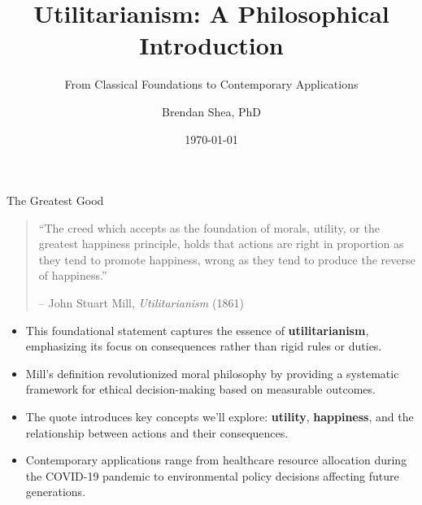 \documentclass[aspectratio=169]{beamer}
\title{Utilitarianism: A Philosophical Introduction}
\subtitle{From Classical Foundations to Contemporary Applications}
\author{Brendan Shea, PhD}
\date{\today}
\begin{document}
\begin{frame}
    \titlepage
\end{frame}

\begin{frame}{The Greatest Good}
    \begin{quote}
        ``The creed which accepts as the foundation of morals, utility, or the greatest happiness principle, holds that actions are right in proportion as they tend to promote happiness, wrong as they tend to produce the reverse of happiness.''
        \vspace{0.5em}
        
        -- John Stuart Mill, \textit{Utilitarianism} (1861)
    \end{quote}
    \vspace{1em}
    \begin{itemize}
        \item This foundational statement captures the essence of \textbf{utilitarianism}, emphasizing its focus on consequences rather than rigid rules or duties.
        \item Mill's definition revolutionized moral philosophy by providing a systematic framework for ethical decision-making based on measurable outcomes.
        \item The quote introduces key concepts we'll explore: \textbf{utility}, \textbf{happiness}, and the relationship between actions and their consequences.
        \item Contemporary applications range from healthcare resource allocation during the COVID-19 pandemic to environmental policy decisions affecting future generations.
    \end{itemize}
\end{frame}
\end{document}
